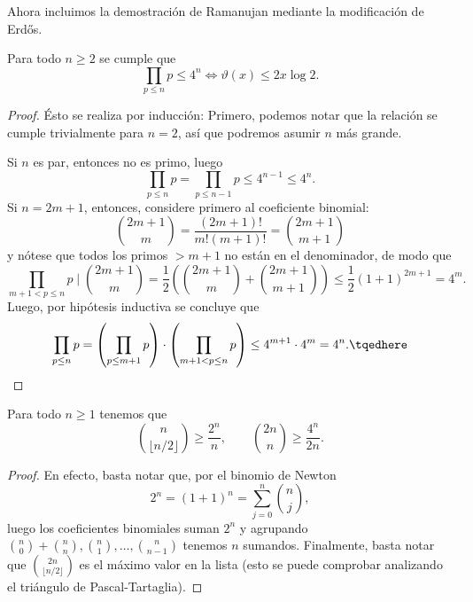 \documentclass[teoria-numeros.tex]{subfiles}
\begin{document}
Ahora incluimos la demostración de Ramanujan mediante la modificación de Erd\H os.
\begin{thm}\label{thm:prime_prod_ineq}
	Para todo $n\ge 2$ se cumple que
	$$ \prod_{p\le n} p \le 4^n \iff \vartheta(x) \le 2x\log 2. $$
\end{thm}
\begin{proof}
	Ésto se realiza por inducción:
	Primero, podemos notar que la relación se cumple trivialmente para $n=2$, así que podremos asumir $n$ más grande.

	Si $n$ es par, entonces no es primo, luego
	$$ \prod_{p\le n} p = \prod_{p\le n-1} p \le 4^{n-1} \le 4^n. $$
	Si $n = 2m+1$, entonces, considere primero al coeficiente binomial:
	$$ \binom{2m+1}{m} = \frac{(2m+1)!}{m!(m+1)!} = \binom{2m+1}{m+1} $$
	y nótese que todos los primos $>m+1$ no están en el denominador, de modo que
	$$ \prod_{m+1 < p \le n} p \mid \binom{2m+1}{m} = \frac{1}{2}\left( \binom{2m+1}{m} + \binom{2m+1}{m+1} \right) \le \frac{1}{2}(1 + 1)^{2m+1} = 4^m. $$
	Luego, por hipótesis inductiva se concluye que
	\begin{equation}
		\prod_{p \le n} p = \left( \prod_{p \le m+1} p \right) \cdot \left( \prod_{m+1<p\le n}p \right) \le 4^{m+1} \cdot 4^m = 4^n. \tqedhere
	\end{equation}
\end{proof}

\begin{lem}
	Para todo $n \ge 1$ tenemos que
	$$ \binom{n}{\lfloor n/2 \rfloor} \ge \frac{2^n}{n}, \qquad \binom{2n}{n} \ge \frac{4^n}{2n}. $$
\end{lem}
\begin{proof}
	En efecto, basta notar que, por el binomio de Newton
	$$ 2^n = (1 + 1)^n = \sum_{j=0}^{n} \binom{n}{j}, $$
	luego los coeficientes binomiales suman $2^n$ y agrupando $\binom{n}{0} + \binom{n}{n}, \binom{n}{1}, \dots, \binom{n}{n-1}$
	tenemos $n$ sumandos.
	Finalmente, basta notar que $\binom{2n}{\lfloor n/2 \rfloor}$ es el máximo valor en la lista (esto se puede comprobar analizando el triángulo
	de Pascal-Tartaglia).
\end{proof}
\end{document}
